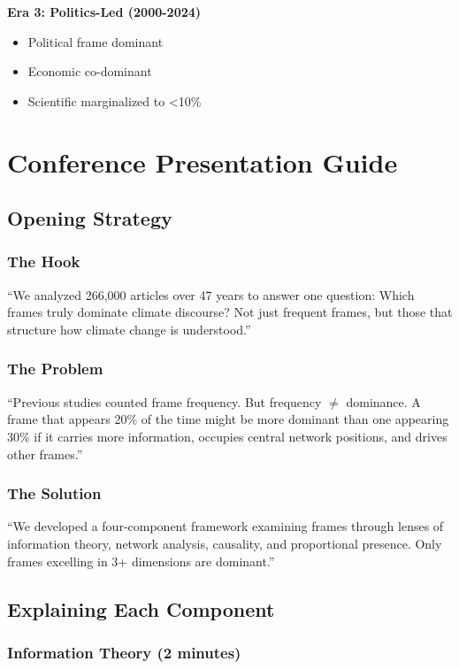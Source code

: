 \documentclass[11pt]{article}
\begin{document}
\textbf{Era 3: Politics-Led (2000-2024)}
\begin{itemize}
    \item Political frame dominant
    \item Economic co-dominant
    \item Scientific marginalized to <10\%
\end{itemize}

\section{Conference Presentation Guide}

\subsection{Opening Strategy}

\subsubsection{The Hook}
``We analyzed 266,000 articles over 47 years to answer one question: Which frames truly dominate climate discourse? Not just frequent frames, but those that structure how climate change is understood.''

\subsubsection{The Problem}
``Previous studies counted frame frequency. But frequency $\neq$ dominance. A frame that appears 20\% of the time might be more dominant than one appearing 30\% if it carries more information, occupies central network positions, and drives other frames.''

\subsubsection{The Solution}
``We developed a four-component framework examining frames through lenses of information theory, network analysis, causality, and proportional presence. Only frames excelling in 3+ dimensions are dominant.''

\subsection{Explaining Each Component}

\subsubsection{Information Theory (2 minutes)}
\end{document}
